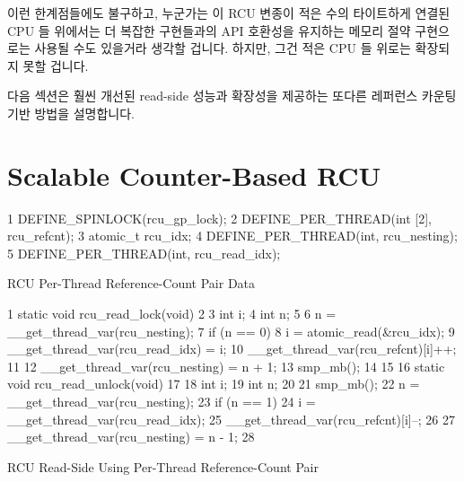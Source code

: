 이런 한계점들에도 불구하고, 누군가는 이 RCU 변종이 적은 수의 타이트하게 연결된
CPU 들 위에서는 더 복잡한 구현들과의 API 호환성을 유지하는 메모리 절약
구현으로는 사용될 수도 있을거라 생각할 겁니다.
하지만, 그건 적은 CPU 들 위로는 확장되지 못할 겁니다.

다음 섹션은 훨씬 개선된 read-side 성능과 확장성을 제공하는 또다른 레퍼런스
카운팅 기반 방법을 설명합니다.
\iffalse

Despite these shortcomings, one could imagine this variant
of RCU being used on small tightly coupled multiprocessors,
perhaps as a memory-conserving implementation that maintains
API compatibility with more complex implementations.
However, it would not likely scale well beyond a few CPUs.

The next section describes yet another variation on the reference-counting
scheme that provides greatly improved read-side performance and scalability.
\fi

\section{Scalable Counter-Based RCU}
\label{sec:app:toyrcu:Scalable Counter-Based RCU}

\begin{listing}[tb]
{ \scriptsize
\begin{verbbox}
  1 DEFINE_SPINLOCK(rcu_gp_lock);
  2 DEFINE_PER_THREAD(int [2], rcu_refcnt);
  3 atomic_t rcu_idx;
  4 DEFINE_PER_THREAD(int, rcu_nesting);
  5 DEFINE_PER_THREAD(int, rcu_read_idx);
\end{verbbox}
}
\centering
\theverbbox
\caption{RCU Per-Thread Reference-Count Pair Data}
\label{lst:app:toyrcu:RCU Per-Thread Reference-Count Pair Data}
\end{listing}

\begin{listing}[tb]
{ \scriptsize
\begin{verbbox}
  1 static void rcu_read_lock(void)
  2 {
  3   int i;
  4   int n;
  5
  6   n = __get_thread_var(rcu_nesting);
  7   if (n == 0) {
  8     i = atomic_read(&rcu_idx);
  9     __get_thread_var(rcu_read_idx) = i;
 10     __get_thread_var(rcu_refcnt)[i]++;
 11   }
 12   __get_thread_var(rcu_nesting) = n + 1;
 13   smp_mb();
 14 }
 15
 16 static void rcu_read_unlock(void)
 17 {
 18   int i;
 19   int n;
 20
 21   smp_mb();
 22   n = __get_thread_var(rcu_nesting);
 23   if (n == 1) {
 24      i = __get_thread_var(rcu_read_idx);
 25      __get_thread_var(rcu_refcnt)[i]--;
 26   }
 27   __get_thread_var(rcu_nesting) = n - 1;
 28 }
\end{verbbox}
}
\centering
\theverbbox
\caption{RCU Read-Side Using Per-Thread Reference-Count Pair}
\label{lst:app:toyrcu:RCU Read-Side Using Per-Thread Reference-Count Pair}
\end{listing}

